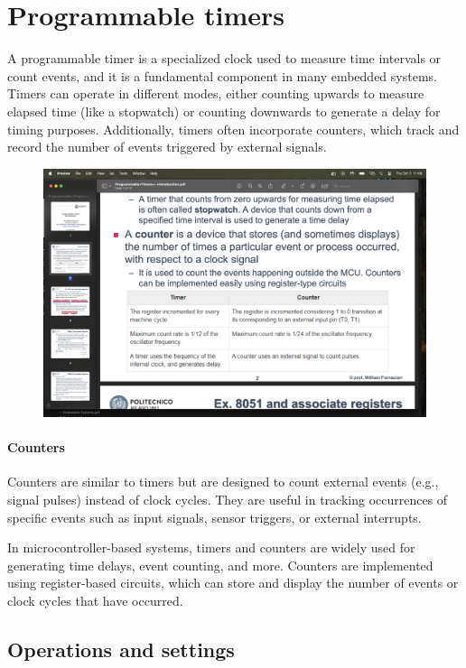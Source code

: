 \section{Programmable timers}

A programmable timer is a specialized clock used to measure time intervals or count events, and it is a fundamental component in many embedded systems. 
Timers can operate in different modes, either counting upwards to measure elapsed time (like a stopwatch) or counting downwards to generate a delay for timing purposes. 
Additionally, timers often incorporate counters, which track and record the number of events triggered by external signals.
\begin{figure}[H]
    \centering
    \includegraphics[width=0.75\linewidth]{images/tim.png}
\end{figure}

\paragraph*{Counters}
Counters are similar to timers but are designed to count external events (e.g., signal pulses) instead of clock cycles. 
They are useful in tracking occurrences of specific events such as input signals, sensor triggers, or external interrupts.

In microcontroller-based systems, timers and counters are widely used for generating time delays, event counting, and more. 
Counters are implemented using register-based circuits, which can store and display the number of events or clock cycles that have occurred.

\subsection{Operations and settings}
